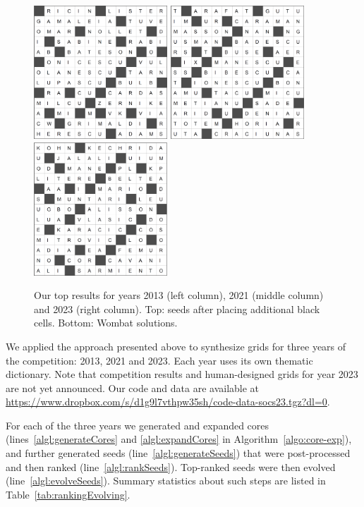 \begin{figure}[th]
\vspace{0.25cm}

\includegraphics[height=5cm]{2013b.png}
%
\hspace{1cm}
%
\includegraphics[height=5cm]{2021b.png}
%
\hspace{1cm}
%
\includegraphics[height=5cm]{2023b.png}

\caption{Our top results for years 2013 (left column), 2021 (middle column) and 2023 (right column). Top: seeds after placing additional black cells. Bottom: {\sc Wombat} solutions.}
\label{fig:results}
\end{figure}

We applied the approach presented above to synthesize grids for three years of the competition: 2013, 2021 and 2023. Each year uses its own thematic dictionary. Note that competition results and human-designed grids for year 2023 are not yet announced. Our code and data are available at \url{https://www.dropbox.com/s/d1g9l7vthpw35sh/code-data-socs23.tgz?dl=0}.


For each of the three years we generated and expanded cores (lines~\ref{algl:generateCores} and \ref{algl:expandCores} in Algorithm~\ref{algo:core-exp}), and further generated seeds (line~\ref{algl:generateSeeds}) that were 
post-processed and then ranked (line~\ref{algl:rankSeeds}). Top-ranked seeds were then evolved (line~\ref{algl:evolveSeeds}). Summary statistics about such steps are listed in Table~\ref{tab:rankingEvolving}.

